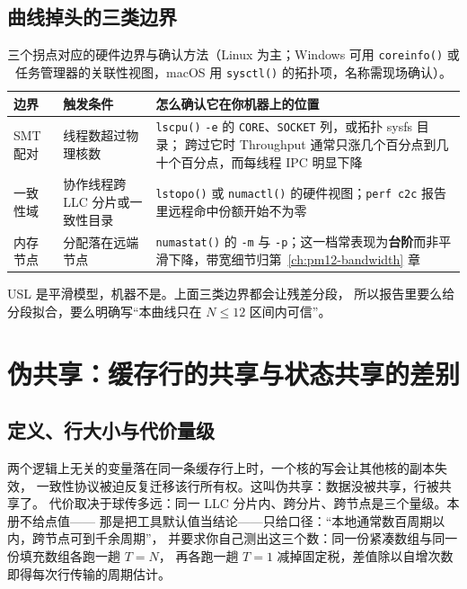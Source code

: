 \documentclass[12pt,a4paper,fontset=fandol]{ctexbook}
\newcommand{\Fn}[1]{\texttt{#1()}}
\newcommand{\Tp}[1]{\texttt{#1}}
\newcommand{\Lang}[1]{\textsf{#1}}
\newcommand{\MThr}{\Lang{Throughput}}
\newcommand{\Mx}[1]{\textsf{#1}}
\begin{document}
\subsection{曲线掉头的三类边界}

\begin{table}[htbp]
\centering
\small
\begin{tabular}{>{\raggedright\arraybackslash}p{}
                >{\raggedright\arraybackslash}p{}
                >{\raggedright\arraybackslash}p{}}
\toprule
边界 & 触发条件 & 怎么确认它在你机器上的位置 \\
\midrule
SMT 配对 & 线程数超过物理核数 &
  \Fn{lscpu} \Tp{-e} 的 \Tp{CORE}、\Tp{SOCKET} 列，或拓扑 sysfs 目录；
  跨过它时 \MThr{} 通常只涨几个百分点到几十个百分点，而每线程 \Mx{IPC} 明显下降 \\
一致性域 & 协作线程跨 LLC 分片或一致性目录 &
  \Fn{lstopo} 或 \Fn{numactl} 的硬件视图；\Tp{perf c2c} 报告里远程命中份额开始不为零 \\
内存节点 & 分配落在远端节点 &
  \Fn{numastat} 的 \Tp{-m} 与 \Tp{-p}；这一档常表现为\textbf{台阶}而非平滑下降，带宽细节归第~\ref{ch:pm12-bandwidth} 章 \\
\bottomrule
\end{tabular}
\caption{三个拐点对应的硬件边界与确认方法（Linux 为主；Windows 可用 \Fn{coreinfo}
或任务管理器的关联性视图，macOS 用 \Fn{sysctl} 的拓扑项，名称需现场确认）。}
\label{tab:pm09-boundary}
\end{table}

USL 是平滑模型，机器不是。上面三类边界都会让残差分段，
所以报告里要么给分段拟合，要么明确写``本曲线只在 $N \le 12$ 区间内可信''。

\section{伪共享：缓存行的共享与状态共享的差别}
\label{sec:pm09-fs}

\subsection{定义、行大小与代价量级}

两个逻辑上无关的变量落在同一条缓存行上时，一个核的写会让其他核的副本失效，
一致性协议被迫反复迁移该行所有权。这叫伪共享：数据没被共享，行被共享了。
代价取决于球传多远：同一 LLC 分片内、跨分片、跨节点是三个量级。本册不给点值——
那是把工具默认值当结论——只给口径：``本地通常数百周期以内，跨节点可到千余周期''，
并要求你自己测出这三个数：同一份紧凑数组与同一份填充数组各跑一趟 $T=N$，
再各跑一趟 $T=1$ 减掉固定税，差值除以自增次数即得每次行传输的周期估计。
\end{document}

